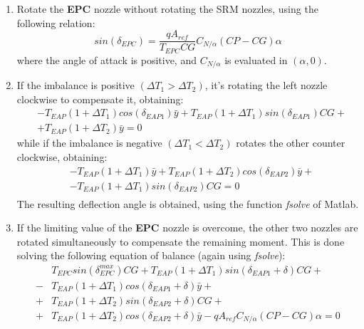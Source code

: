 \documentclass[12pt,fleqn,openany]{book} %
\begin{document}
\begin{enumerate}
 \item Rotate the \textbf{EPC} nozzle without rotating the SRM nozzles, using the following relation:\\
 \begin{equation}
  sin(\delta_{EPC})=\frac{qA_{ref}}{T_{EPC}CG}C_{N/\alpha}(CP-CG)\alpha
 \end{equation}
 where the angle of attack is positive, and $C_{N/\alpha}$ is evaluated in $(\alpha,0)$.\\
 \item If the imbalance is positive $(\Delta T_1>\Delta T_2)$, it’s rotating the left nozzle clockwise to compensate it, obtaining:\\
 \begin{equation}\begin{split}
  &-T_{EAP}(1+\Delta T_1)cos(\delta_{EAP1})\bar{y}+T_{EAP}(1+\Delta T_1)sin(\delta_{EAP1})CG+\\
  &+T_{EAP}(1+\Delta T_2)\bar{y}=0
 \end{split}\end{equation}
 while if the imbalance is negative $(\Delta T_1<\Delta T_2)$ rotates the other counter clockwise, obtaining: \\
 \begin{equation}\begin{split}
  &-T_{EAP}(1+\Delta T_1)\bar{y}+T_{EAP}(1+\Delta T_2)cos(\delta_{EAP2})\bar{y}+\\
  &-T_{EAP}(1+\Delta T_1)sin(\delta_{EAP2})CG=0
 \end{split}\end{equation}
 The resulting deflection angle is obtained, using the function \textit{fsolve} of Matlab\textsuperscript\textregistered.\\
 \item If the limiting value of the \textbf{EPC} nozzle is overcome, the other two nozzles are rotated simultaneously to compensate the remaining moment. This is done solving the following equation of balance (again using \textit{fsolve}): 
 \begin{equation}\begin{split}
  &T_{EPC}sin(\delta_{EPC}^{max})CG+T_{EAP}(1+\Delta T_1)sin(\delta_{EAP1}+\delta)CG+ \\
  -&T_{EAP}(1+\Delta T_1)cos(\delta_{EAP1}+\delta)\bar{y}+\\
  +&T_{EAP}(1+\Delta T_2)sin(\delta_{EAP2}+\delta)CG+ \\
  +&T_{EAP}(1+\Delta T_2)cos(\delta_{EAP2}+\delta)\bar{y}-qA_{ref}C_{N/\alpha}(CP-CG)\alpha=0

\end{split}
\end{equation}
\end{enumerate}
\end{document}
